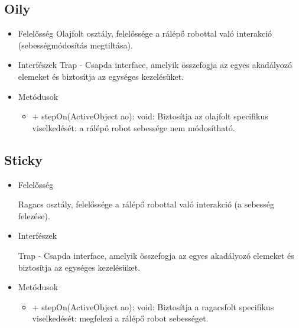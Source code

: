 \subsection{Oily}
\begin{itemize}
	\item Felelősség\newline
	Olajfolt osztály, felelőssége a rálépő robottal való interakció (sebességmódosítás megtiltása).
	\item Interfészek\newline
	Trap  - Csapda interface, amelyik összefogja az egyes akadályozó elemeket és biztosítja az egységes kezelésüket.
	\item Metódusok
	\begin{itemize}
		\item + stepOn(ActiveObject ao): void: Biztosítja az olajfolt specifikus viselkedését: a rálépő robot sebessége nem módosítható.
	\end{itemize}
\end{itemize}


\subsection{Sticky}
\begin{itemize}
	\item Felelősség
	
	Ragacs osztály, felelőssége a rálépő robottal való interakció (a sebesség felezése).
	\item Interfészek
	
	Trap - Csapda interface, amelyik összefogja az egyes akadályozó elemeket és biztosítja az egységes kezelésüket.

	\item Metódusok
	\begin{itemize}
		\item + stepOn(ActiveObject ao): void: Biztosítja a ragacsfolt specifikus viselkedését: megfelezi a rálépő robot sebességet.
	\end{itemize}
\end{itemize}

